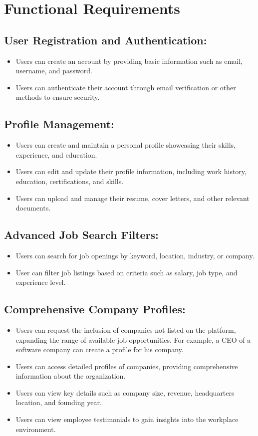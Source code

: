 \documentclass[titlepage]{article}
\begin{document}
\section{Functional Requirements}
\subsection{User Registration and Authentication:}
\begin{itemize}
    \item Users can create an account by providing basic information such as email, username, and password.
    \item Users can authenticate their account through email verification or other methods to ensure security.
\end{itemize}
\subsection{Profile Management:}
\begin{itemize}
    \item Users can create and maintain a personal profile showcasing their skills, experience, and education.
    \item Users can edit and update their profile information, including work history, education, certifications, and skills.
    \item Users can upload and manage their resume, cover letters, and other relevant documents.
\end{itemize}

\subsection{Advanced Job Search Filters:}
\begin{itemize}
    \item Users can search for job openings by keyword, location, industry, or company.
    \item User can filter job listings based on criteria such as salary, job type, and experience level.
\end{itemize}

\subsection{Comprehensive Company Profiles:}
\begin{itemize}
    \item Users can request the inclusion of companies not listed on the platform, expanding the range of available job opportunities. For example, a CEO of a software company can create a profile for his company.
    \item Users can access detailed profiles of companies, providing comprehensive information about the organization.
    \item Users can view key details such as company size, revenue, headquarters location, and founding year.
    \item Users can view employee testimonials to gain insights into the workplace environment.
\end{itemize}
\end{document}
